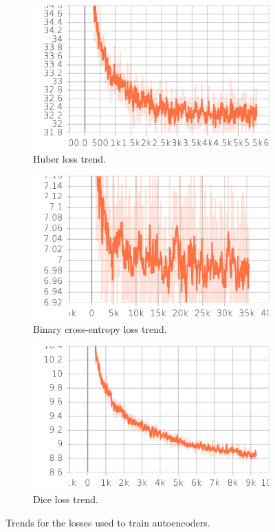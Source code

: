 \begin{figure}
    \centering
    \begin{subfigure}{.45\textwidth}
    \includegraphics[width=\textwidth]{graphics/work-artifacts/vae/43/loss.pdf}    
    \caption{Huber loss trend.}
    \end{subfigure}
    \begin{subfigure}{.45\textwidth}
    \includegraphics[width=\textwidth]{graphics/work-artifacts/vae/89/loss.pdf}    
    \caption{Binary cross-entropy loss trend.}
    \end{subfigure}
    \begin{subfigure}{.45\textwidth}
    \includegraphics[width=\textwidth]{graphics/work-artifacts/vae/79/loss.pdf}    
    \caption{Dice loss trend.}
    \label{fig:ae.dice.loss}
    \end{subfigure}
    \caption{Trends for the losses used to train autoencoders.}
    \label{fig:ae.loss}
\end{figure}

